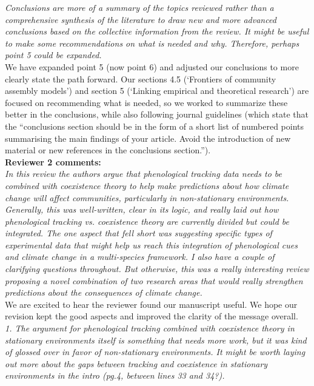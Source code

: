 \documentclass[11pt]{article}
\begin{document}
\emph{Conclusions are more of a summary of the topics reviewed rather than a comprehensive
synthesis of the literature to draw new and more advanced conclusions based on the collective
information from the review. It might be useful to make some recommendations on what is
needed and why. Therefore, perhaps point 5 could be expanded.}\\

We have expanded point 5 (now point 6) and adjusted our conclusions to more clearly state the path forward. Our sections 4.5 (`Frontiers of community assembly models') and section 5 (`Linking empirical and theoretical research') are focused on recommending what is needed, so we worked to summarize these better in the conclusions, while also following journal guidelines (which state that the ``conclusions section should be in the form of a short list of numbered points summarising the main findings of your article. Avoid the introduction of new material or new references in the conclusions section.'').  \\

{\bf Reviewer 2 comments:} \\

\emph{In this review the authors argue that phenological tracking data needs to be combined with
coexistence theory to help make predictions about how climate change will affect communities,
particularly in non-stationary environments. Generally, this was well-written, clear in its
logic, and really laid out how phenological tracking vs. coexistence theory are currently
divided but could be integrated. The one aspect that fell short was suggesting specific types
of experimental data that might help us reach this integration of phenological cues and
climate change in a multi-species framework. I also have a couple of clarifying questions
throughout. But otherwise, this was a really interesting review proposing a novel combination
of two research areas that would really strengthen predictions about the consequences of
climate change.}\\

We are excited to hear the reviewer found our manuscript useful. We hope our revision kept the good aspects and improved the clarity of the message overall.\\

\emph{1.      The argument for phenological tracking combined with coexistence theory in stationary
environments itself is something that needs more work, but it was kind of glossed over in
favor of non-stationary environments. It might be worth laying out more about the gaps
between tracking and coexistence in stationary environments in the intro (pg.4, between lines
33 and 34?).}\\
\end{document}
